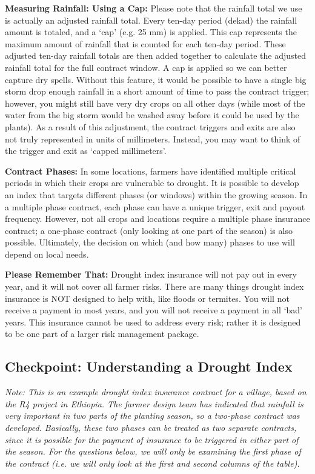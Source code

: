 \documentclass[letterpaper,10pt,english]{sphinxmanual}
\begin{document}
\textbf{Measuring Rainfall: Using a Cap:} Please note that the rainfall total we use is actually an adjusted rainfall total. Every ten-day period (dekad) the rainfall amount is totaled, and a `cap' (e.g. 25 mm) is applied. This cap represents the maximum amount of rainfall that is counted for each ten-day period. These adjusted ten-day rainfall totals are then added together to calculate the adjusted rainfall total for the full contract window. A cap is applied so we can better capture dry spells. Without this feature, it would be possible to have a single big storm drop enough rainfall in a short amount of time to pass the contract trigger; however, you might still have very dry crops on all other days (while most of the water from the big storm would be washed away before it could be used by the plants). As a result of this adjustment, the contract triggers and exits are also not truly represented in units of millimeters. Instead, you may want to think of the trigger and exit as `capped millimeters'.

\textbf{Contract Phases:} In some locations, farmers have identified multiple critical periods in which their crops are vulnerable to drought. It is possible to develop an index that targets different phases (or windows) within the growing season. In a multiple phase contract, each phase can have a unique trigger, exit and payout frequency. However, not all crops and locations require a multiple phase insurance contract; a one-phase contract (only looking at one part of the season) is also possible.  Ultimately, the decision on which (and how many) phases to use will depend on local needs.

\textbf{Please Remember That:} Drought index insurance will not pay out in every year, and it will not cover all farmer risks. There are many things drought index insurance is NOT designed to help with, like floods or termites. You will not receive a payment in most years, and you will not receive a payment in all `bad' years. This insurance cannot be used to address every risk; rather it is designed to be one part of a larger risk management package.


\subsection{Checkpoint: Understanding a Drought Index}
\label{whatisindexinsurance/understandingadroughtindex_en_Web:checkpoint-understanding-a-drought-index}
\emph{Note: This is an example drought index insurance contract for a village, based on the R4 project in Ethiopia. The farmer design team has indicated that rainfall is very important in two parts of the planting season, so a two-phase contract was developed. Basically, these two phases can be treated as two separate contracts, since it is possible for the payment of insurance to be triggered in either part of the season. For the questions below, we will only be examining the first phase of the contract (i.e. we will only look at the first and second columns of the table).}
\end{document}
